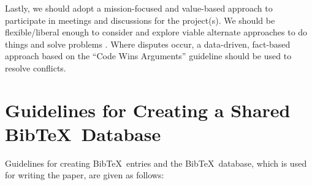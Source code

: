 \documentclass[letter,12pt]{article}
\begin{document}
Lastly, we should adopt a mission-focused and value-based approach to participate in meetings and discussions for the project(s). We should be flexible/liberal enough to consider and explore viable alternate approaches to do things and solve problems \cite{Beedle2001,Beedle2001a}. Where disputes occur, a data-driven, fact-based approach based on the ``Code Wins Arguments'' guideline should be used to resolve conflicts.

\section{Guidelines for Creating a Shared {\sc Bib}\TeX\ Database}
\label{sec:GuidelinesforCreatingaSharedBibTeXDatabase}

Guidelines for creating {\sc Bib}\TeX\ entries and the {\sc Bib}\TeX\ database, which is used for writing the paper, are given as follows: \vspace{-0.2cm}
\end{document}
